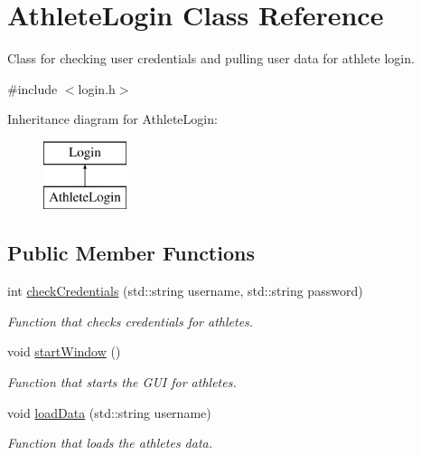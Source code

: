 \hypertarget{classAthleteLogin}{}\section{Athlete\+Login Class Reference}
\label{classAthleteLogin}


Class for checking user credentials and pulling user data for athlete login.  




{\ttfamily \#include $<$login.\+h$>$}

Inheritance diagram for Athlete\+Login\+:\begin{figure}[H]
\begin{center}
\leavevmode
\includegraphics[height=2.000000cm]{classAthleteLogin}
\end{center}
\end{figure}
\subsection*{Public Member Functions}
\begin{DoxyCompactItemize}
\item 
int \mbox{\hyperlink{classAthleteLogin_a6cd600072b11803af3ca93442c11b7d9}{check\+Credentials}} (std\+::string username, std\+::string password)
\begin{DoxyCompactList}\small\item\em Function that checks credentials for athletes. \end{DoxyCompactList}\item 
void \mbox{\hyperlink{classAthleteLogin_a2a6d59d4e84de8c26fd9736c9b569f8e}{start\+Window}} ()
\begin{DoxyCompactList}\small\item\em Function that starts the G\+UI for athletes. \end{DoxyCompactList}\item 
void \mbox{\hyperlink{classAthleteLogin_a739caa9c5aed1003d2f19c49ec4a8854}{load\+Data}} (std\+::string username)
\begin{DoxyCompactList}\small\item\em Function that loads the athletes data. \end{DoxyCompactList}\end{DoxyCompactItemize}
